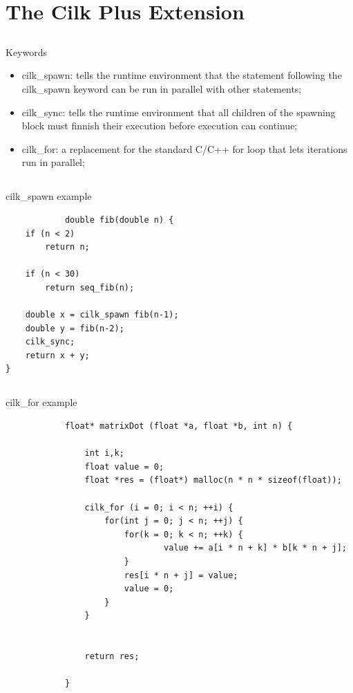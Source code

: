 \documentclass{beamer}
\begin{document}
\section{The Cilk Plus Extension}
\subsection{}
\begin{frame}[fragile]
	\begin{block}{Keywords}	
		\begin{itemize}
			\item cilk\_spawn: tells the runtime environment that the statement following the cilk\_spawn keyword can be run in parallel with other statements;
			\item cilk\_sync: tells the runtime environment that all children of the spawning block must finnish their execution before execution can continue;
			\item cilk\_for: a replacement for the standard C/C++ for loop that lets iterations run in parallel;
		\end{itemize}
	\end{block}
\end{frame}


\subsection{}
\begin{frame}[fragile]
	\begin{block}{cilk\_spawn example}	
		\begin{lstlisting}
			double fib(double n) {
    if (n < 2)
        return n;

    if (n < 30)
        return seq_fib(n);

    double x = cilk_spawn fib(n-1);
    double y = fib(n-2);
    cilk_sync;
    return x + y;
}
		\end{lstlisting}
	\end{block}
\end{frame}



\subsection{}
\begin{frame}[fragile]
	\begin{block}{cilk\_for example}	
		\begin{lstlisting}
			float* matrixDot (float *a, float *b, int n) {

				int i,k;
				float value = 0;
				float *res = (float*) malloc(n * n * sizeof(float));

				cilk_for (i = 0; i < n; ++i) {
					for(int j = 0; j < n; ++j) {			
						for(k = 0; k < n; ++k) {
								value += a[i * n + k] * b[k * n + j];
						}
						res[i * n + j] = value;
						value = 0;
					}
				}
				
				
				return res;

			}
		\end{lstlisting}
	\end{block}
\end{frame}
\end{document}
